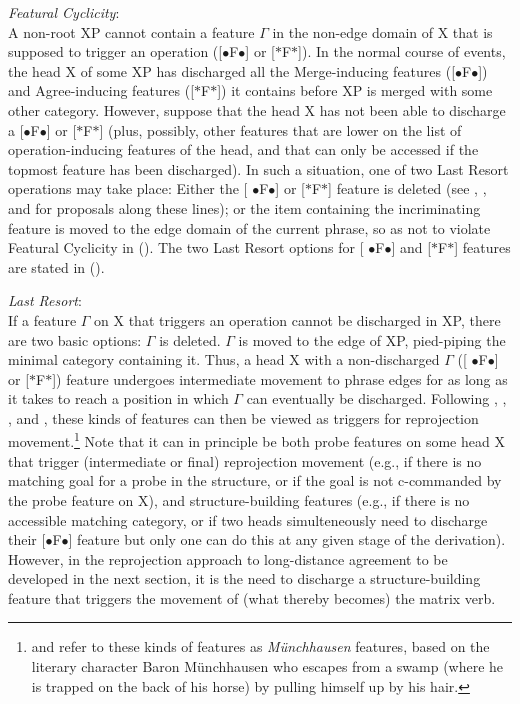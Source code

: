 \documentclass[output=paper
,modfonts
,nonflat]{langsci/langscibook}
\begin{document}
\ea\label{ex:mueller:27} {\itshape Featural \label{fc}Cyclicity}:\\
A non-root XP cannot contain a feature $\Gamma$ in the non-edge domain of X that is supposed to trigger an operation ([{\small $\bullet$}F{\small $\bullet$}] or [$*$F$*$]).\z
In the normal course of events, the head X of some XP has discharged
all the Merge-inducing features ([{\small $\bullet$}F{\small $\bullet$}])
 and Agree-inducing features ([$*$F$*$]) it contains before XP is merged with some
 other category. However, suppose that the head X has not been able to
 discharge a [{\small $\bullet$}F{\small $\bullet$}] or [$*$F$*$]
 (plus, possibly, other features that are lower on the list of
 operation-inducing features of the head, and that can only be accessed
 if the topmost feature has been discharged). In such a situation, one
 of two Last Resort operations may take place: Either the [{\small
     $\bullet$}F{\small $\bullet$}] or [$*$F$*$] feature is deleted (see 
\cite{Bejar&Rezac:09},
  \cite{Preminger:14}, and  \cite{Georgi:14} for proposals along these
  lines); or the item containing the incriminating feature is moved to the edge domain of
  the current phrase, so as not to violate Featural Cyclicity
  in (\Last). The two Last Resort options for [{\small
      $\bullet$}F{\small $\bullet$}] and [$*$F$*$] features are stated
  in (\Next). 

\ea\label{ex:mueller:28} {\itshape Last Resort}:\\
If a feature $\Gamma$ on X that triggers an operation cannot be discharged
in XP, there are two basic options:
\ea $\Gamma$ is deleted.
\ex $\Gamma$ is moved to the edge of XP, pied-piping the minimal
category containing it. 
\z
\z
Thus, a head X with a non-discharged $\Gamma$ ([{\small
    $\bullet$}F{\small $\bullet$}] or [$*$F$*$]) feature undergoes
intermediate movement to phrase edges for as long as it takes to reach
a position in which $\Gamma$ can eventually be discharged.  Following
\cite{Fanselow:03,Fanselow:09:boo}, \cite{Suranyi:05},
\cite{Matushansky:06}, and \cite{Georgi&Mueller:10:rep}, these kinds
of features can then be viewed as triggers for reprojection
movement.\footnote{\cite{Fanselow:03,Fanselow:09:boo} and
  \cite{Georgi&Mueller:10:rep} refer to these kinds of features as
       {\itshape M\"unchhausen} features, based on the literary character
       Baron M\"unchhausen who escapes from a swamp (where he is
       trapped on the back of his horse) by pulling himself up by his
       hair.} Note that it can in principle be both probe features on
some head X that trigger (intermediate or final) reprojection movement
(e.g., if there is no matching goal for a probe in the structure, or
if the goal is not c-commanded by the probe feature on X), and
structure-building features (e.g., if there is no accessible matching
category, or if two heads simulteneously need to discharge their
[{\small $\bullet$}F{\small $\bullet$}] feature but only one can do
this at any given stage of the derivation). However, in the
reprojection approach to long-distance agreement to be developed in
the next section, it is the need to discharge a structure-building
feature that triggers the movement of (what thereby becomes) the
matrix verb.
\end{document}
